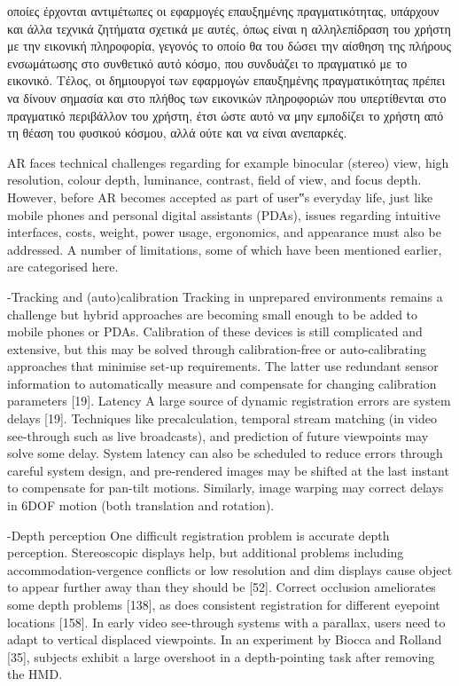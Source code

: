 οποίες έρχονται αντιμέτωπες οι εφαρμογές επαυξημένης πραγματικότητας, υπάρχουν και άλλα τεχνικά ζητήματα σχετικά με αυτές, όπως είναι η αλληλεπίδραση του χρήστη με την εικονική πληροφορία, γεγονός το οποίο θα του δώσει την αίσθηση της πλήρους ενσωμάτωσης στο συνθετικό αυτό κόσμο, που συνδυάζει το πραγματικό με το εικονικό. Τέλος, οι δημιουργοί των εφαρμογών επαυξημένης πραγματικότητας πρέπει να δίνουν σημασία και στο πλήθος των εικονικών πληροφοριών που υπερτίθενται στο πραγματικό περιβάλλον του χρήστη, έτσι ώστε αυτό να μην εμποδίζει το χρήστη από τη θέαση του φυσικού κόσμου, αλλά ούτε και να είναι ανεπαρκές.
 

AR faces technical challenges regarding for example binocular
(stereo) view, high resolution, colour depth, luminance,
contrast, field of view, and focus depth. However,
before AR becomes accepted as part of user‟s everyday life,
just like mobile phones and personal digital assistants
(PDAs), issues regarding intuitive interfaces, costs, weight,
power usage, ergonomics, and appearance must also be addressed.
A number of limitations, some of which have been
mentioned earlier, are categorised here.


-Tracking and (auto)calibration
Tracking in unprepared environments remains a challenge
but hybrid approaches are becoming small enough to be added to mobile phones or PDAs. Calibration of these devices
is still complicated and extensive, but this may be
solved through calibration-free or auto-calibrating approaches
that minimise set-up requirements. The latter use
redundant sensor information to automatically measure and
compensate for changing calibration parameters [19].
Latency A large source of dynamic registration errors are
system delays [19]. Techniques like precalculation, temporal
stream matching (in video see-through such as live broadcasts),
and prediction of future viewpoints may solve some
delay. System latency can also be scheduled to reduce errors
through careful system design, and pre-rendered images may
be shifted at the last instant to compensate for pan-tilt motions.
Similarly, image warping may correct delays in 6DOF
motion (both translation and rotation).

-Depth perception
One difficult registration problem is accurate depth perception.
Stereoscopic displays help, but additional problems
including accommodation-vergence conflicts or low resolution
and dim displays cause object to appear further away
than they should be [52]. Correct occlusion ameliorates some
depth problems [138], as does consistent registration for
different eyepoint locations [158].
In early video see-through systems with a parallax, users
need to adapt to vertical displaced viewpoints. In an experiment
by Biocca and Rolland [35], subjects exhibit a large
overshoot in a depth-pointing task after removing the HMD.

